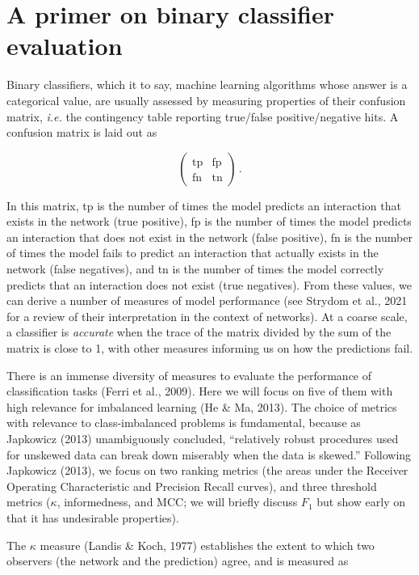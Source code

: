 \documentclass[10pt,oneside]{article}
\begin{document}
\hypertarget{a-primer-on-binary-classifier-evaluation}{%
\section{A primer on binary classifier
evaluation}\label{a-primer-on-binary-classifier-evaluation}}

Binary classifiers, which it to say, machine learning algorithms whose
answer is a categorical value, are usually assessed by measuring
properties of their confusion matrix, \emph{i.e.} the contingency table
reporting true/false positive/negative hits. A confusion matrix is laid
out as

\[\begin{pmatrix}
    \text{tp} & \text{fp} \\
    \text{fn} & \text{tn}
\end{pmatrix} \,.\]

In this matrix, tp is the number of times the model predicts an
interaction that exists in the network (true positive), fp is the number
of times the model predicts an interaction that does not exist in the
network (false positive), fn is the number of times the model fails to
predict an interaction that actually exists in the network (false
negatives), and tn is the number of times the model correctly predicts
that an interaction does not exist (true negatives). From these values,
we can derive a number of measures of model performance (see Strydom et
al., 2021 for a review of their interpretation in the context of
networks). At a coarse scale, a classifier is \emph{accurate} when the
trace of the matrix divided by the sum of the matrix is close to 1, with
other measures informing us on how the predictions fail.

There is an immense diversity of measures to evaluate the performance of
classification tasks (Ferri et al., 2009). Here we will focus on five of
them with high relevance for imbalanced learning (He \& Ma, 2013). The
choice of metrics with relevance to class-imbalanced problems is
fundamental, because as Japkowicz (2013) unambiguously concluded,
``relatively robust procedures used for unskewed data can break down
miserably when the data is skewed.'' Following Japkowicz (2013), we
focus on two ranking metrics (the areas under the Receiver Operating
Characteristic and Precision Recall curves), and three threshold metrics
(\(\kappa\), informedness, and MCC; we will briefly discuss \(F_1\) but
show early on that it has undesirable properties).

The \(\kappa\) measure (Landis \& Koch, 1977) establishes the extent to
which two observers (the network and the prediction) agree, and is
measured as
\end{document}
